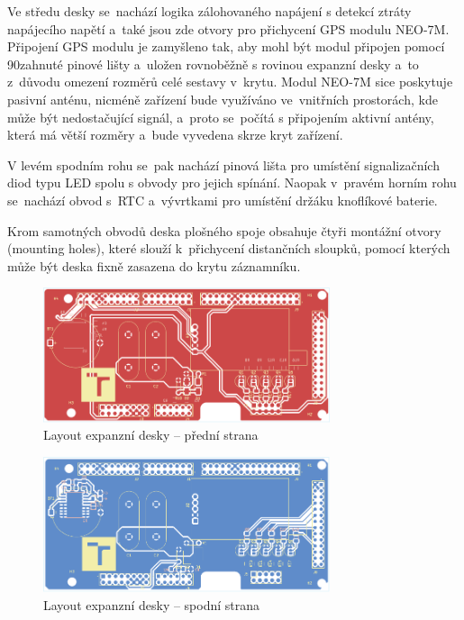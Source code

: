 Ve středu desky se~nachází logika zálohovaného napájení s detekcí ztráty napájecího napětí a~také jsou zde otvory pro přichycení GPS modulu NEO-7M. Připojení GPS modulu je zamyšleno tak, aby mohl být modul připojen pomocí 90\textdegree zahnuté pinové lišty a~uložen rovnoběžně s rovinou expanzní desky a~to z~důvodu omezení rozměrů celé sestavy v~krytu. Modul NEO-7M sice poskytuje pasivní anténu, nicméně zařízení bude využíváno ve~vnitřních prostorách, kde může být nedostačující signál, a~proto se~počítá s připojením aktivní antény, která má větší rozměry a~bude vyvedena skrze kryt zařízení. 

V levém spodním rohu se~pak nachází pinová lišta pro umístění signalizačních diod typu LED spolu s obvody pro jejich spínání. Naopak v~pravém horním rohu se~nachází obvod s~RTC a~vývrtkami pro umístění držáku knoflíkové baterie.

Krom samotných obvodů deska plošného spoje obsahuje čtyři montážní otvory (mounting holes), které slouží k~přichycení distančních sloupků, pomocí kterých může být deska fixně zasazena do krytu záznamníku.

\begin{figure}[h]
    \centering
    \includegraphics[width=0.75\textwidth]{obrazky-figures/extension_shield-brd-front.pdf}
    
    \caption{Layout expanzní desky -- přední strana}
    \label{fig:layout-front}
\end{figure}

\begin{figure}[h]
    \centering
    \includegraphics[width=0.75\textwidth]{obrazky-figures/extension_shield-brd-back.pdf}
    
    \caption{Layout expanzní desky -- spodní strana}
    \label{fig:layout-back}
\end{figure}

